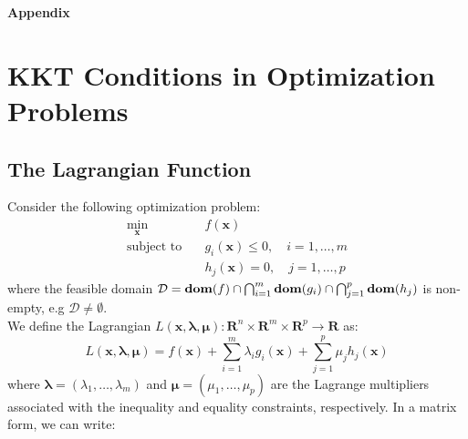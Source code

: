 \clearpage

\begin{center}
    {\Huge\bfseries Appendix}
\end{center}

\vspace{1cm}

\appendix
\renewcommand{\thesection}{\Alph{section}}

\section{KKT Conditions in Optimization Problems}
\label{app:kkt}
\subsection{The Lagrangian Function}
Consider the following optimization problem:
\begin{equation}
    \begin{aligned}
        \min_{\mathbf{x}} & \quad f(\mathbf{x}) \\
        \text{subject to} & \quad g_i(\mathbf{x}) \leq 0, \quad i = 1, \ldots, m \\
        & \quad h_j(\mathbf{x}) = 0, \quad j = 1, \ldots, p
    \end{aligned}
\end{equation}
where the feasible domain $\mathcal{D} = \text{\textbf{dom}}(f) \cap \bigcap_{i=1}^m \text{\textbf{dom}}(g_i) \cap \bigcap_{j=1}^p \text{\textbf{dom}}(h_j)$ is non-empty, e.g $\mathcal{D} \neq \emptyset$.\\
We define the Lagrangian $L(\mathbf{x}, \boldsymbol{\lambda}, \boldsymbol{\mu}): \mathbf{R}^n \times \mathbf{R}^m \times \mathbf{R}^p \to \mathbf{R}$ as:
\begin{equation}
    L(\mathbf{x}, \boldsymbol{\lambda}, \boldsymbol{\mu}) = f(\mathbf{x}) + \sum_{i=1}^m \lambda_i g_i(\mathbf{x}) + \sum_{j=1}^p \mu_j h_j(\mathbf{x})
\end{equation}
where $\boldsymbol{\lambda} = (\lambda_1, \ldots, \lambda_m)$ and $\boldsymbol{\mu} = (\mu_1, \ldots, \mu_p)$ are the Lagrange multipliers associated with the inequality and equality constraints, respectively. In a matrix form, we can write:

